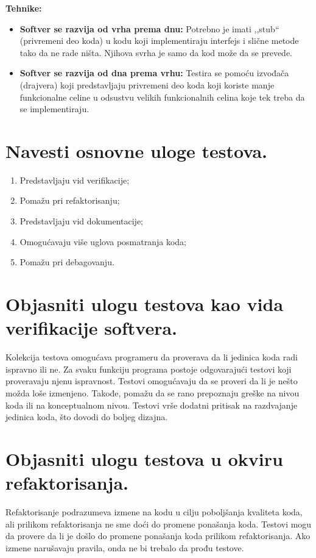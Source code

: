 \documentclass[a4paper]{article}
\begin{document}
  \noindent \textbf{Tehnike:}
  \begin{itemize}
    \item \textbf{Softver se razvija od vrha prema dnu:} Potrebno je imati ,,stub`` (privremeni deo 
          koda) u kodu koji implementiraju interfejs i slične metode tako da ne rade ništa. Njihova
          svrha je samo da kod može da se prevede. 
    \item \textbf{Softver se razvija od dna prema vrhu:} Testira se pomoću izvođača (drajvera) koji
          predstavljaju privremeni deo koda koji koriste manje funkcionalne celine u odsustvu
          velikih funkcionalnih celina koje tek treba da se implementiraju.
  \end{itemize}

\section{Navesti osnovne uloge testova.}
  \begin{enumerate}
    \item Predstavljaju vid verifikacije;
    \item Pomažu pri refaktorisanju;
    \item Predstavljaju vid dokumentacije;
    \item Omogućavaju više uglova posmatranja koda;
    \item Pomažu pri debagovanju.
  \end{enumerate}

\section{Objasniti ulogu testova kao vida verifikacije softvera.}
  Kolekcija testova omogućava programeru da proverava da li jedinica koda radi ispravno ili ne.
  Za svaku funkciju programa postoje odgovarajući testovi koji proveravaju njenu ispravnost. 
  Testovi omogućavaju da se proveri da li je nešto možda loše izmenjeno. Takođe, pomažu da se rano
  prepoznaju greške na nivou koda ili na konceptualnom nivou. Testovi vrše dodatni pritisak
  na razdvajanje jedinica koda, što dovodi do boljeg dizajna. 

\section{Objasniti ulogu testova u okviru refaktorisanja.}
  Refaktorisanje podrazumeva izmene na kodu u cilju poboljšanja kvaliteta koda, ali
  prilikom refaktorisanja ne sme doći do promene ponašanja koda. Testovi mogu da provere
  da li je došlo do promene ponašanja koda prilikom refaktorisanja. Ako izmene narušavaju
  pravila, onda ne bi trebalo da prođu testove.
\end{document}
